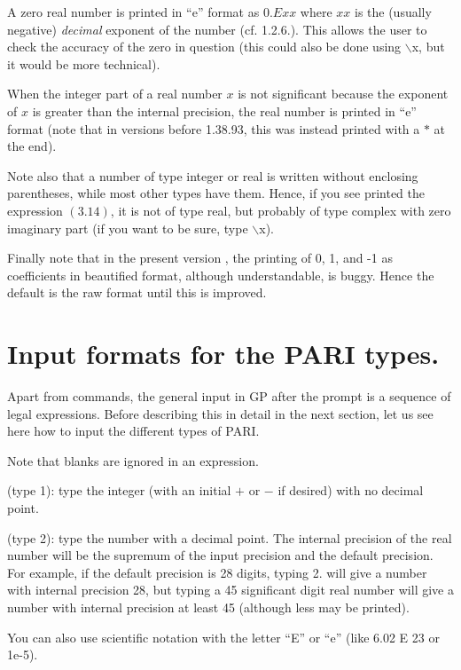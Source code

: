 
A zero real number is printed in ``e'' format as $0.Exx$ where $xx$ is the
(usually negative) {\it decimal\/} exponent of the number (cf. 1.2.6.).
This allows the user to check the accuracy of the zero in question
(this could also be done using $\backslash$x, but it would be more technical).

When the integer part of a real number $x$ is not significant because the
exponent of $x$ is greater than the internal precision, the real number
is printed in ``e'' format (note that in versions before 1.38.93, this
was instead printed with a $*$ at the end).

Note also that a number of type integer or real is written without
enclosing parentheses, while most other types have them. Hence, if you see
printed the expression $( 3.14 )$, it is not of type real, but probably of
type complex with zero imaginary part (if you want to be sure, type
$\backslash$x).

Finally note that in the present version \vers, the printing of 0, 1, and
-1 as coefficients in beautified format, although understandable, is buggy.
Hence the default is the raw format until this is improved.

\section{Input formats for the PARI types.}

Apart from commands, the general input in GP after the prompt is a sequence of legal
expressions. Before describing this in detail in the next section, let us see
here how to input the different types of PARI.

Note that blanks are ignored in an expression.

 (type 1): type the integer (with an initial
$+$ or $-$ if desired) with no decimal point.

 (type 2): type the number with a decimal
point. The internal precision of the real number will be the supremum of the
input precision and the default precision. For example, if the default
precision is 28 digits, typing 2. will give a number with internal precision
28, but typing a 45 significant digit real number will give a number with
internal precision at least 45 (although less may be printed).

You can also use scientific notation with the letter ``E'' or ``e''
(like 6.02 E 23 or 1e-5).

